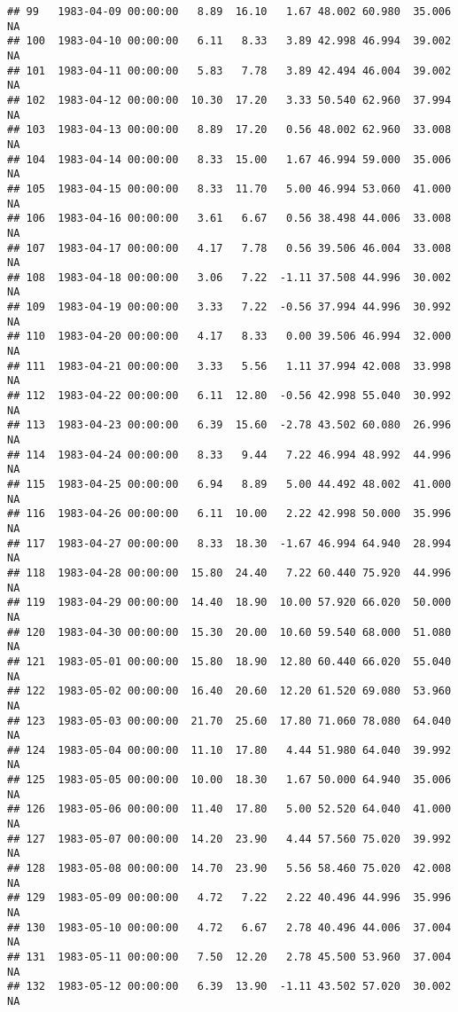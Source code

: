 \documentclass{article}\usepackage{graphicx, color}
\makeatletter
\newenvironment{kframe}{%
 \def\at@end@of@kframe{}%
 \ifinner\ifhmode%
  \def\at@end@of@kframe{\end{minipage}}%
  \begin{minipage}{\columnwidth}%
 \fi\fi%
 \def\FrameCommand##1{\hskip\@totalleftmargin \hskip-\fboxsep
 \colorbox{shadecolor}{##1}\hskip-\fboxsep
     \hskip-\linewidth \hskip-\@totalleftmargin \hskip\columnwidth}%
 \MakeFramed {\advance\hsize-\width
   \@totalleftmargin\z@ \linewidth\hsize
   \@setminipage}}%
 {\par\unskip\endMakeFramed%
 \at@end@of@kframe}
\newenvironment{knitrout}{}{} %
\makeatother
\begin{document}
\begin{knitrout}
\begin{kframe}
\begin{verbatim}
## 99   1983-04-09 00:00:00   8.89  16.10   1.67 48.002 60.980  35.006     NA
## 100  1983-04-10 00:00:00   6.11   8.33   3.89 42.998 46.994  39.002     NA
## 101  1983-04-11 00:00:00   5.83   7.78   3.89 42.494 46.004  39.002     NA
## 102  1983-04-12 00:00:00  10.30  17.20   3.33 50.540 62.960  37.994     NA
## 103  1983-04-13 00:00:00   8.89  17.20   0.56 48.002 62.960  33.008     NA
## 104  1983-04-14 00:00:00   8.33  15.00   1.67 46.994 59.000  35.006     NA
## 105  1983-04-15 00:00:00   8.33  11.70   5.00 46.994 53.060  41.000     NA
## 106  1983-04-16 00:00:00   3.61   6.67   0.56 38.498 44.006  33.008     NA
## 107  1983-04-17 00:00:00   4.17   7.78   0.56 39.506 46.004  33.008     NA
## 108  1983-04-18 00:00:00   3.06   7.22  -1.11 37.508 44.996  30.002     NA
## 109  1983-04-19 00:00:00   3.33   7.22  -0.56 37.994 44.996  30.992     NA
## 110  1983-04-20 00:00:00   4.17   8.33   0.00 39.506 46.994  32.000     NA
## 111  1983-04-21 00:00:00   3.33   5.56   1.11 37.994 42.008  33.998     NA
## 112  1983-04-22 00:00:00   6.11  12.80  -0.56 42.998 55.040  30.992     NA
## 113  1983-04-23 00:00:00   6.39  15.60  -2.78 43.502 60.080  26.996     NA
## 114  1983-04-24 00:00:00   8.33   9.44   7.22 46.994 48.992  44.996     NA
## 115  1983-04-25 00:00:00   6.94   8.89   5.00 44.492 48.002  41.000     NA
## 116  1983-04-26 00:00:00   6.11  10.00   2.22 42.998 50.000  35.996     NA
## 117  1983-04-27 00:00:00   8.33  18.30  -1.67 46.994 64.940  28.994     NA
## 118  1983-04-28 00:00:00  15.80  24.40   7.22 60.440 75.920  44.996     NA
## 119  1983-04-29 00:00:00  14.40  18.90  10.00 57.920 66.020  50.000     NA
## 120  1983-04-30 00:00:00  15.30  20.00  10.60 59.540 68.000  51.080     NA
## 121  1983-05-01 00:00:00  15.80  18.90  12.80 60.440 66.020  55.040     NA
## 122  1983-05-02 00:00:00  16.40  20.60  12.20 61.520 69.080  53.960     NA
## 123  1983-05-03 00:00:00  21.70  25.60  17.80 71.060 78.080  64.040     NA
## 124  1983-05-04 00:00:00  11.10  17.80   4.44 51.980 64.040  39.992     NA
## 125  1983-05-05 00:00:00  10.00  18.30   1.67 50.000 64.940  35.006     NA
## 126  1983-05-06 00:00:00  11.40  17.80   5.00 52.520 64.040  41.000     NA
## 127  1983-05-07 00:00:00  14.20  23.90   4.44 57.560 75.020  39.992     NA
## 128  1983-05-08 00:00:00  14.70  23.90   5.56 58.460 75.020  42.008     NA
## 129  1983-05-09 00:00:00   4.72   7.22   2.22 40.496 44.996  35.996     NA
## 130  1983-05-10 00:00:00   4.72   6.67   2.78 40.496 44.006  37.004     NA
## 131  1983-05-11 00:00:00   7.50  12.20   2.78 45.500 53.960  37.004     NA
## 132  1983-05-12 00:00:00   6.39  13.90  -1.11 43.502 57.020  30.002     NA

\end{verbatim}
\end{kframe}
\end{knitrout}
\end{document}
